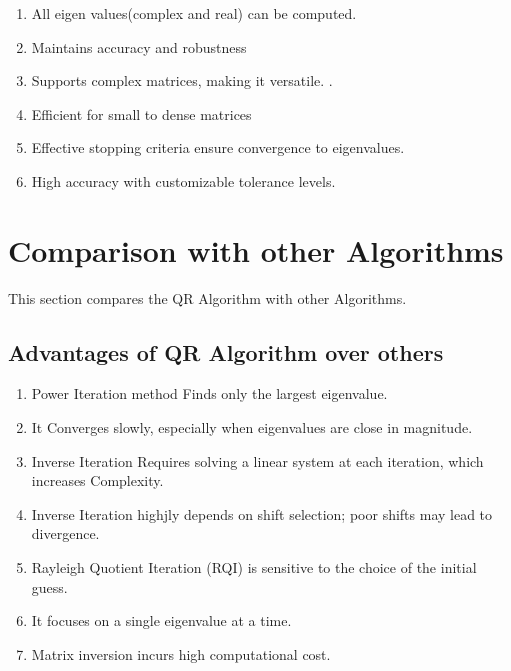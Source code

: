 \documentclass[12pt]{article}
\begin{document}
\begin{enumerate}
    \item All eigen values(complex and real) can be computed.
    \item Maintains accuracy and robustness
    \item  Supports complex matrices, making it versatile.
   .
    \item Efficient for small to dense matrices
    \item Effective stopping criteria ensure convergence to eigenvalues.
    \item  High accuracy with customizable tolerance levels.
\end{enumerate}

\section{Comparison with other Algorithms}

This section compares the QR Algorithm with other Algorithms.

\subsection*{Advantages of QR Algorithm over others}

\begin{enumerate}
  
    \item Power Iteration method Finds only the largest eigenvalue.
    \item It Converges slowly, especially when eigenvalues are close in magnitude.
       \item Inverse Iteration Requires solving a linear system at each iteration, which increases Complexity.
    \item Inverse Iteration highjly depends on shift selection; poor shifts may lead to divergence.



    \item Rayleigh Quotient Iteration (RQI) is sensitive to the choice of the initial guess.
    \item It focuses on a single eigenvalue at a time.
    \item Matrix inversion incurs high computational cost.
\end{enumerate}
\end{document}
